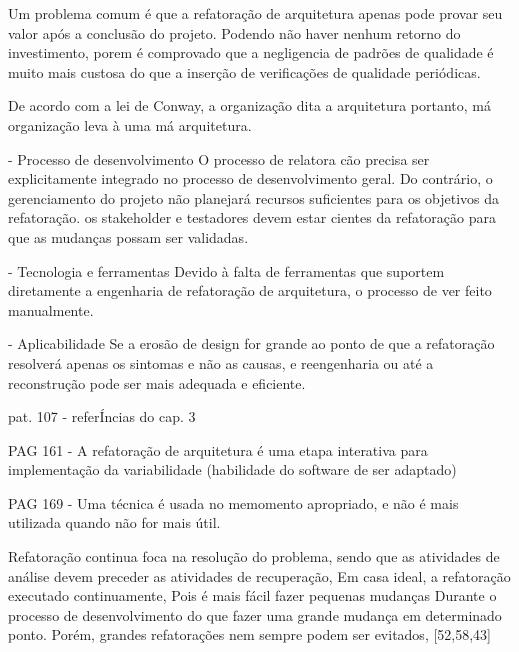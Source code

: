 Um problema comum é que a refatoração de arquitetura apenas pode provar seu valor após a conclusão do projeto. Podendo não haver nenhum retorno do investimento, porem é comprovado que a negligencia de padrões de qualidade é muito mais custosa do que a inserção de verificações de qualidade periódicas.

De acordo com a lei de Conway, a organização dita a arquitetura portanto, má organização leva à uma má arquitetura.


- Processo de desenvolvimento
O processo de relatora
cão precisa ser explicitamente integrado no processo de desenvolvimento geral. Do contrário, o gerenciamento do projeto não planejará recursos suficientes para os objetivos da refatoração.
os stakeholder e testadores devem estar cientes da refatoração para que as mudanças possam ser validadas.

- Tecnologia e ferramentas
Devido à falta de ferramentas que suportem diretamente a engenharia de refatoração de arquitetura, o processo de ver feito manualmente.

- Aplicabilidade
Se a erosão de design for grande ao ponto de que a refatoração resolverá apenas os sintomas e não as causas, e reengenharia ou até a reconstrução pode ser mais adequada e eficiente.



 

pat. 107 - referÍncias do cap. 3 























PAG 161 - A refatoração de arquitetura é uma etapa interativa para implementação da variabilidade (habilidade do software de ser adaptado)

PAG 169 - Uma técnica é usada no memomento apropriado, e não é mais utilizada quando não for mais útil.

Refatoração continua foca na resolução do problema, sendo que as atividades de análise devem preceder as atividades de recuperação, Em casa ideal, a refatoração executado continuamente, Pois é mais fácil fazer pequenas mudanças Durante o processo de desenvolvimento do que fazer uma grande mudança em determinado ponto. Porém, grandes refatorações nem sempre podem ser evitados, [52,58,43]









\cite{hofmeister2007general}
